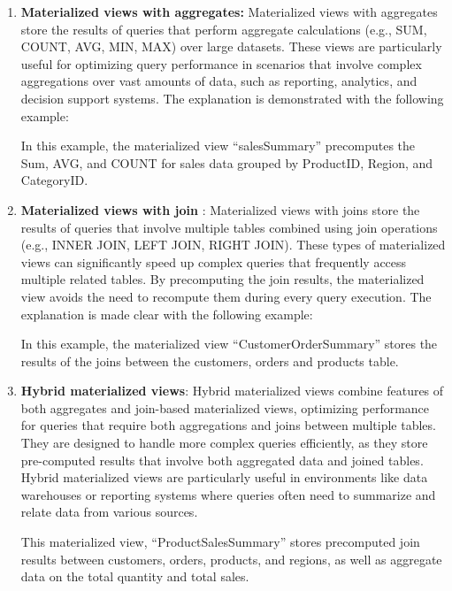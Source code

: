 \begin{enumerate}[label=\alph*)]
    \item \textbf{Materialized views with aggregates:} Materialized views with aggregates store the results of queries that perform aggregate calculations (e.g., SUM, COUNT, AVG, MIN, MAX) over large datasets. These views are particularly useful for optimizing query performance in scenarios that involve complex aggregations over vast amounts of data, such as reporting, analytics, and decision support systems. The explanation is demonstrated with the following example:\vspace{.4cm}
    
    

    In this example, the materialized view ``salesSummary'' precomputes the Sum, AVG, and COUNT for sales data grouped by ProductID, Region, and CategoryID.

    \item \textbf{Materialized views with join }: Materialized views with joins store the results of queries that involve multiple tables combined using join operations (e.g., INNER JOIN, LEFT JOIN, RIGHT JOIN). These types of materialized views can significantly speed up complex queries that frequently access multiple related tables. By precomputing the join results, the materialized view avoids the need to recompute them during every query execution. The explanation is made clear with the following example: \vspace{.4cm}
    
    

    In this example, the materialized view ``CustomerOrderSummary''
    stores the results of the joins between the customers, orders and products table.
    
    \item \textbf{Hybrid materialized views}: Hybrid materialized views combine features of both aggregates and join-based materialized views, optimizing performance for queries that require both aggregations and joins between multiple tables. They are designed to handle more complex queries efficiently, as they store pre-computed results that involve both aggregated data and joined tables. Hybrid materialized views are particularly useful in environments like data warehouses or reporting systems where queries often need to summarize and relate data from various sources. \vspace{.4cm}
    
     
    
This materialized view, ``ProductSalesSummary'' stores precomputed join results between customers, orders, products, and regions, as well as aggregate data on the total quantity and total sales.
    
\end{enumerate}

